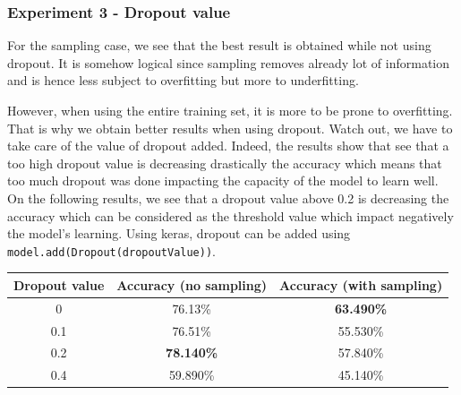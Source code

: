\documentclass[11pt, openany]{report}
\theoremstyle{plain}
\theoremstyle{definition}
\theoremstyle{remark}
\begin{document}
\subsubsection{Experiment 3 - Dropout value} 

For the sampling case, we see that the best result is obtained while not using dropout. It is somehow logical since sampling removes already lot of information and is hence less subject to overfitting but more to underfitting. 

However, when using the entire training set, it is more to be prone to overfitting. That is why we obtain better results when using dropout. Watch out, we have to take care of the value of dropout added. Indeed, the results show that see that a too high dropout value is decreasing drastically the accuracy which means that too much dropout was done impacting the capacity of the model to learn well. On the following results, we see that a dropout value above 0.2 is decreasing the accuracy which can be considered as the threshold value which impact negatively the model's learning. Using keras, dropout can be added using \texttt{model.add(Dropout(dropoutValue))}. 

\begin{center}
\begin{tabular}{|c|c|c|}
  \hline
  Dropout value & Accuracy (no sampling) & Accuracy (with sampling) \\
  \hline
  0 & 76.13\% &  \textbf{63.490\%} \\
  0.1 & 76.51\% & 55.530\% \\
  0.2 & \textbf{78.140\%} & 57.840\% \\
  0.4 & 59.890\% & 45.140\% \\
  \hline
\end{tabular}
\end{center}
\end{document}
